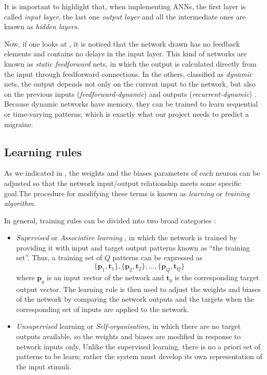 It is important to highlight that, when implementing ANNs, the first layer is called \emph{input layer}, the last one \emph{output layer} and all the intermediate ones are known as \emph{hidden layers}. 

Now, if one looks at , it is noticed that the network drawn has no feedback elements and contains no delays in the input layer. This kind of networks are known as \emph{static feedforward} nets, in which the output is calculated
directly from the input through feedforward connections. 
In the others, classified as \emph{dynamic} nets,
the output depends not only on the current input to the network, but also on the previous inputs (\emph{feedforward-dynamic}) and  outputs (\emph{recurrent-dynamic}) \cite{dimith3neural}.
Because dynamic networks have memory, they can be trained to learn sequential or time-varying patterns, which is exactly what our project needs to predict a migraine. 







\subsection{Learning rules}
\label{subsec:learningrules}

As we indicated in , the weights and the biases parameters of each neuron can be adjusted so that the network input/output relationship meets some specific goal.The procedure for modifying these terms is known as \emph{learning} or \emph{training algorithm}. 

In general, training rules can be divided into two broad categories \cite{demuth2008neural}:
\begin{itemize}
\item \emph{Supervised} or \emph{Associative learning}
, in which the network is trained by providing it with input and target output patterns known as ``the training set''. Thus, a training set of $Q$ patterns can be expressed as
\begin{equation}
\{\mathbf{p}_1,\mathbf{t}_1\},\{\mathbf{p}_2,\mathbf{t}_2\}, ... , \{\mathbf{p}_Q,\mathbf{t}_Q\}
\end{equation}
where $\mathbf{p}_q$ is an input vector of the network and $\mathbf{t}_q$ is the corresponding target output vector.
The learning rule is then used to adjust the weights and biases of the network by comparing the network outputs and the targets when the corresponding set of inputs are applied to the network.
\item \emph{Unsupervised} learning or \emph{Self-organisation}, in which there are no target outputs available, so the weights and biases are modified in response to network inputs only. 
Unlike the supervised learning, there is no a priori set of patterns to be learn;
rather the system must develop its own representation of the input stimuli.
\end{itemize}

